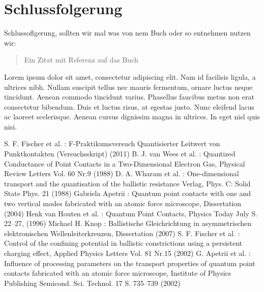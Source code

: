\documentclass[aps,twocolumn,secnumarabic,nobalancelastpage,amsmath,amssymb,
nofootinbib,superscriptaddress]{revtex4-1}
\begin{document}
\section{Schlussfolgerung}

Schlussoflgerung, sollten wir mal was von nem Buch oder so entnehmen nutzen wir:


\begin{quote}
  Ein Zitat mit Referenz auf das Buch\cite{melissinos1966}
\end{quote}

Lorem ipsum dolor sit amet, consectetur adipiscing elit. Nam id facilisis ligula,
a ultrices nibh. Nullam suscipit tellus nec mauris fermentum, ornare luctus neque
tincidunt. Aenean commodo tincidunt varius. Phasellus faucibus metus non erat
consectetur bibendum. Duis et luctus risus, at egestas justo. Nunc eleifend lacus
ac laoreet scelerisque. Aenean cursus dignissim magna in ultrices. In eget nisl
quis nisi.




\begin{thebibliography}{99}
S. F. Fischer et al. : F-Praktikumsversuch Quantisierter Leitwert von Punktkontakten (Versuchsskript) (2011)
B. J. van Wees et al. : Quantized Conductance of Point Contacts in a Two-Dimensional Electron Gas, Physical Review Letters Vol. 60 Nr.9 (1988)
D. A. Wharam et al. : One-dimensional transport and the quantisation of the ballistic resistance Verlag, Phys. C: Solid State Phys. 21  (1988)
Gabriela Apetrii : Quantum point contacts with one and two vertical modes fabricated with an atomic force microscope, Dissertation (2004)
Henk van Houten et al. :  Quantum Point Contacts, Physics Today July S. 22–27, (1996)
Michael H. Knop :  Ballistische Gleichrichtung in asymmetrischen elektronischen Wellenleiterkreuzen, Dissertation (2007)
S. F. Fischer et al. :  Control of the confining potential in ballistic constrictions using a persistent charging effect, Applied Physics Letters Vol. 81 Nr.15 (2002)
G. Apetrii et al. :  Influence of processing parameters on the transport properties of quantum point contacts fabricated with an atomic force microscope, Institute of Physics Publishing Semicond. Sci. Technol. 17 S. 735–739 (2002)
\end{thebibliography}
\end{document}
